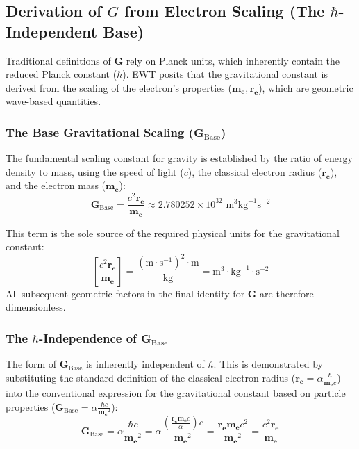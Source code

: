 \documentclass[10pt,a4paper]{article}
\begin{document}
\subsection{Derivation of $G$ from Electron Scaling (The $\hbar$-Independent Base)}

Traditional definitions of $\mathbf{G}$ rely on Planck units, which inherently contain the reduced Planck constant ($\hbar$). EWT posits that the gravitational constant is derived from the scaling of the electron's properties ($\mathbf{m_e}, \mathbf{r_e}$), which are geometric wave-based quantities.

\subsubsection*{The Base Gravitational Scaling ($\mathbf{G}_{\text{Base}}$)}

The fundamental scaling constant for gravity is established by the ratio of energy density to mass, using the speed of light ($c$), the classical electron radius ($\mathbf{r_e}$), and the electron mass ($\mathbf{m_e}$):
\begin{equation}
	\mathbf{G}_{\text{Base}} = \frac{c^2 \mathbf{r_e}}{\mathbf{m_e}} \approx 2.780252 \times 10^{32} \text{ m}^3\text{kg}^{-1}\text{s}^{-2}
	\label{eq:G_base_scaling}
\end{equation}

This term is the sole source of the required physical units for the gravitational constant:
\begin{equation}
	\left[ \frac{c^2 \mathbf{r_e}}{\mathbf{m_e}} \right] = \frac{\left(\text{m} \cdot \text{s}^{-1}\right)^2 \cdot \text{m}}{\text{kg}} = \text{m}^3 \cdot \text{kg}^{-1} \cdot \text{s}^{-2}
\end{equation}
All subsequent geometric factors in the final identity for $\mathbf{G}$ are therefore dimensionless.

\subsubsection*{The $\hbar$-Independence of $\mathbf{G}_{\text{Base}}$}

The form of $\mathbf{G}_{\text{Base}}$ is inherently independent of $\hbar$. This is demonstrated by substituting the standard definition of the classical electron radius ($\mathbf{r_e} = \alpha \frac{\hbar}{\mathbf{m_e} c}$) into the conventional expression for the gravitational constant based on particle properties ($\mathbf{G}_{\text{Base}} = \alpha \frac{\hbar c}{\mathbf{m_e}^2}$):
\begin{equation}
	\mathbf{G}_{\text{Base}} = \alpha \frac{\hbar c}{\mathbf{m_e}^2} = \alpha \frac{\left( \frac{\mathbf{r_e} \mathbf{m_e} c}{\alpha} \right) c}{\mathbf{m_e}^2} = \frac{\mathbf{r_e} \mathbf{m_e} c^2}{\mathbf{m_e}^2} = \frac{c^2 \mathbf{r_e}}{\mathbf{m_e}}
\end{equation}
\end{document}
